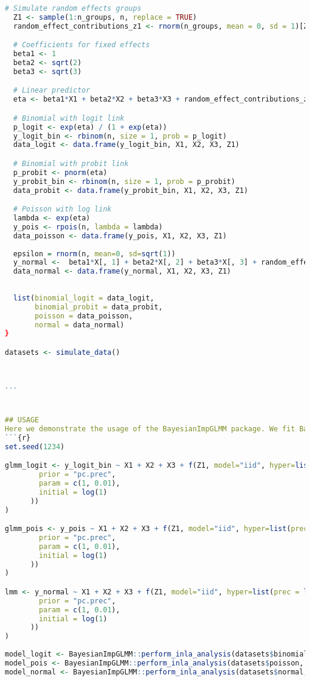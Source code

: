 \begin{lstlisting}[language=R, caption=Usage of the BayesianImpGLMM package with plots and examples.]
  # Simulate random effects groups
  Z1 <- sample(1:n_groups, n, replace = TRUE)
  random_effect_contributions_z1 <- rnorm(n_groups, mean = 0, sd = 1)[Z1]

  # Coefficients for fixed effects
  beta1 <- 1
  beta2 <- sqrt(2)
  beta3 <- sqrt(3)

  # Linear predictor
  eta <- beta1*X1 + beta2*X2 + beta3*X3 + random_effect_contributions_z1

  # Binomial with logit link
  p_logit <- exp(eta) / (1 + exp(eta))
  y_logit_bin <- rbinom(n, size = 1, prob = p_logit)
  data_logit <- data.frame(y_logit_bin, X1, X2, X3, Z1)

  # Binomial with probit link
  p_probit <- pnorm(eta)
  y_probit_bin <- rbinom(n, size = 1, prob = p_probit)
  data_probit <- data.frame(y_probit_bin, X1, X2, X3, Z1)

  # Poisson with log link
  lambda <- exp(eta)
  y_pois <- rpois(n, lambda = lambda)
  data_poisson <- data.frame(y_pois, X1, X2, X3, Z1)
  
  epsilon = rnorm(n, mean=0, sd=sqrt(1))
  y_normal <-  beta1*X[, 1] + beta2*X[, 2] + beta3*X[, 3] + random_effect_contributions_z1 + epsilon 
  data_normal <- data.frame(y_normal, X1, X2, X3, Z1)
  
  
  list(binomial_logit = data_logit, 
       binomial_probit = data_probit, 
       poisson = data_poisson, 
       normal = data_normal)
}

datasets <- simulate_data()



```


## USAGE
Here we demonstrate the usage of the BayesianImpGLMM package. We fit Bayesian binomial, Poisson and gaussian models and sample posterior distributions for different simulated datasets using functions from the package.
```{r}
set.seed(1234)

glmm_logit <- y_logit_bin ~ X1 + X2 + X3 + f(Z1, model="iid", hyper=list(prec = list(
        prior = "pc.prec",
        param = c(1, 0.01),
        initial = log(1)
      ))
)

glmm_pois <- y_pois ~ X1 + X2 + X3 + f(Z1, model="iid", hyper=list(prec = list(
        prior = "pc.prec",
        param = c(1, 0.01),
        initial = log(1)
      ))
)

lmm <- y_normal ~ X1 + X2 + X3 + f(Z1, model="iid", hyper=list(prec = list(
        prior = "pc.prec",
        param = c(1, 0.01),
        initial = log(1)
      ))
)
    
model_logit <- BayesianImpGLMM::perform_inla_analysis(datasets$binomial_logit, glmm_logit, family = "binomial", link_func = "logit")
model_pois <- BayesianImpGLMM::perform_inla_analysis(datasets$poisson, glmm_pois, family = "poisson", link_func = "log")
model_normal <- BayesianImpGLMM::perform_inla_analysis(datasets$normal, lmm, family = "gaussian", link_func = "identity")


\end{lstlisting}
